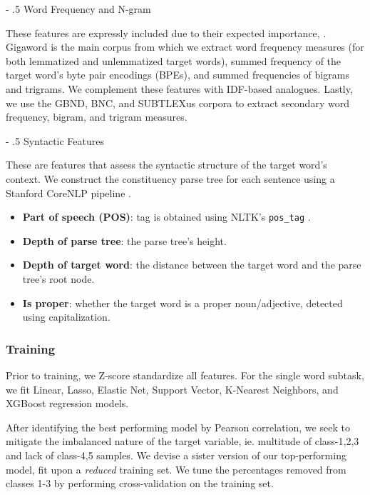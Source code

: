 \documentclass[11pt,a4paper]{article}
\makeatletter
\renewcommand\paragraph{%
    \@startsection{paragraph}{4}{0mm}%
        {-\baselineskip}%
        {.5\baselineskip}%
        {\normalfont\normalsize\bfseries}}
\makeatother
\begin{document}
\paragraph{Word Frequency and N-gram}

These features are expressly included due to their expected importance, \citep{zampieriEtAl:2017:NLPTEA}. Gigaword is the main corpus from which we extract word frequency measures (for both lemmatized and unlemmatized target words), summed frequency of the target word's byte pair encodings (BPEs), and summed frequencies of bigrams and trigrams. We complement these features with IDF-based analogues. Lastly, we use the GBND, BNC, and SUBTLEXus corpora to extract secondary word frequency, bigram, and trigram measures. 

\paragraph{Syntactic Features}

These are features that assess the syntactic structure of the target word's context. We construct the constituency parse tree for each sentence using a Stanford CoreNLP pipeline \citep{manning-EtAl:2014:P14-5}.

\begin{itemize}
  \item \textbf{Part of speech (POS)}: tag is obtained using NLTK's \texttt{pos\_tag} \citep{Loper02nltk:the}.
  \item \textbf{Depth of parse tree}: the parse tree's height.
  \item \textbf{Depth of target word}: the distance between the target word and the parse tree's root node.
  \item \textbf{Is proper}: whether the target word is a proper noun/adjective, detected using capitalization.
\end{itemize}

\subsubsection{Training}

Prior to training, we Z-score standardize all features. For the single word subtask, we fit Linear, Lasso, Elastic Net, Support Vector, K-Nearest Neighbors, and XGBoost regression models. 

After identifying the best performing model by Pearson correlation, we seek to mitigate the imbalanced nature of the target variable, ie. multitude of class-1,2,3 and lack of class-4,5 samples. We devise a sister version of our top-performing model, fit upon a \textit{reduced} training set. We tune the percentages removed from classes 1-3 by performing cross-validation on the training set.
\end{document}
